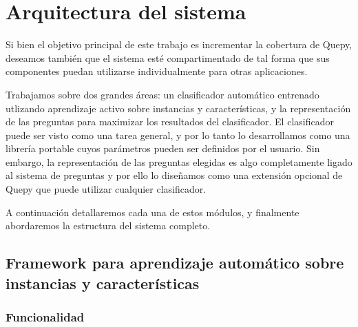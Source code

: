 \section{Arquitectura del sistema}

Si bien el objetivo principal de este trabajo es incrementar la cobertura de Quepy, deseamos también que el sistema esté compartimentado de tal forma que sus componentes puedan utilizarse individualmente para otras aplicaciones.

Trabajamos sobre dos grandes áreas: un clasificador automático entrenado utlizando aprendizaje activo sobre instancias y características, y la representación de las preguntas para maximizar los resultados del clasificador. El clasificador puede ser visto como una tarea general, y por lo tanto lo desarrollamos como una librería portable cuyos parámetros pueden ser definidos por el usuario. Sin embargo, la representación de las preguntas elegidas es algo completamente ligado al sistema de preguntas y por ello lo diseñamos como una extensión opcional de Quepy que puede utilizar cualquier clasificador.

A continuación detallaremos cada una de estos módulos, y finalmente abordaremos la estructura del sistema completo.

\subsection{Framework para aprendizaje automático sobre instancias y características}
\subsubsection{Funcionalidad}

